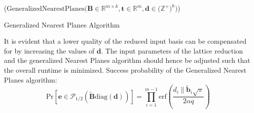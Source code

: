 \begin{algorithm2e}
  \Begin($\text{GeneralizedNearestPlanes} {(} \mathbf{B} \in \mathbb{R}^{m \times k},\mathbf{t} \in \mathbb{R}^{m}, \mathbf{d} \in {(}\mathbb{Z}^+{)}^k {)}$)
    { %
  }
  \caption{Generalized Nearest Planes Algorithm \cite{LP11}}\label{alg:GeneralizedNearestPlanes}
\end{algorithm2e}

It is evident that a lower quality of the reduced input basis can be compensated for by increasing the values of $\mathbf{d}$. The input parameters of the lattice reduction and the generalized Nearest Planes algorithm should hence be adjusted such that the overall runtime is minimized. %
Success probability of the Generalized Nearest Planes algorithm:
\begin{equation}
  \text{Pr}\left[ \mathbf{e} \in \mathcal{P}_{1/2}(\tilde{\mathbf{B}} \text{diag}(\mathbf{d}))\right] = \prod_{i=1}^{m-1} \text{erf}\left(\frac{d_i \|\tilde{\mathbf{b}}_i \sqrt{\pi}}{2\alpha q}\right)
\end{equation} %






